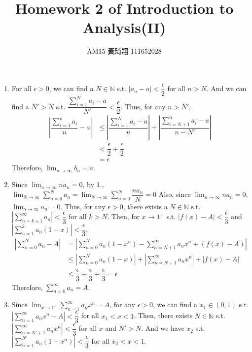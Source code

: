 \documentclass[12pt]{article}
\title{Homework 2 of Introduction to Analysis(II)}
\author{AM15 黃琦翔 111652028}
\begin{document}
\maketitle
\begin{enumerate}
    \item For all $\epsilon > 0$, we can find a $N \in \mathbb{N}$ s.t. $|a_n - a| < \dfrac{\epsilon}{2}$ for all $n > N$.
    And we can find a $N' > N$ s.t. $\dfrac{\displaystyle\sum_{i=1}^{N} a_i - a}{N'} < \dfrac{\epsilon}{2}$.
    Thus, for any $n > N'$, \begin{align*}
        |\dfrac{\sum_{i=1}^{n} a_i }{n} - a| &\leq |\dfrac{\sum_{i=1}^{N} a_i - a}{n}| + |\dfrac{\sum_{i=N+1}^{n} a_i - a}{n - N'}|\\
        &< \dfrac{\epsilon}{2} + \dfrac{\epsilon}{2}\\
        &= \epsilon
    \end{align*}
    Therefore, $\displaystyle\lim_{n\to\infty} b_n = a$.

    \item Since $\displaystyle\lim_{n\to\infty} na_n = 0$, by 1., $\displaystyle\lim_{N\to\infty} \displaystyle\sum_{n=0}^{N} a_n = \displaystyle\lim_{N\to\infty} \displaystyle\sum_{n=0}^{N} \dfrac{na_n}{N} = 0$
    Also, since $\displaystyle\lim_{n\to\infty} na_n = 0$, $\displaystyle\lim_{n\to\infty} a_n = 0$.
    Thus, for any $\epsilon > 0$,  there exists a $N \in \mathbb{N}$ s.t. $|\displaystyle\sum_{n=k+1}^{\infty} a_n| < \dfrac{\epsilon}{3}$ for all $k > N$.
    Then, for $x \to 1^{-}$ s.t. $|f(x) - A| < \dfrac{\epsilon}{3}$ and $|\displaystyle\sum_{n=1}^{k} a_n(1-x)| < \dfrac{\epsilon}{3}$, \begin{align*}
        |\sum_{n=0}^{N} a_n - A| &= |\sum_{n=0}^{N} a_n(1-x^n) - \sum_{n=N+1}^{\infty} a_n x^n + (f(x) - A)|\\
        &\leq |\sum_{n=0}^{N} a_n(1-x)| + |\sum_{n=N+1}^{\infty} a_n x^n| + |f(x) - A|\\
        &\leq \dfrac{\epsilon}{3} + \dfrac{\epsilon}{3} + \dfrac{\epsilon}{3} = \epsilon
    \end{align*}
    Therefore, $\displaystyle\sum_{n=0}^{\infty} a_n = A$.

    \newpage
    \item Since $\displaystyle\lim_{x\to 1^-} \displaystyle\sum_{n=1}^{\infty} a_nx^n = A$,
    for any $\epsilon > 0$, we can find a $x_1 \in (0, 1)$ s.t. $|\displaystyle\sum_{n=1}^{\infty} a_nx^n - A| < \dfrac{\epsilon}{3}$ for all $x_1 < x < 1$.
    Then, there exists $N\in\mathbb{N}$ s.t. $|\displaystyle\sum_{n=N'+1}^{\infty} a_n x^n| < \dfrac{\epsilon}{3}$ for all $x$ and $N' > N$.
    And we have $x_2$ s.t. $|\displaystyle\sum_{n=1}^{N} a_n(1-x^n)| < \dfrac{\epsilon}{3}$ for all $x_2 < x < 1$.


\end{enumerate}
\end{document}

